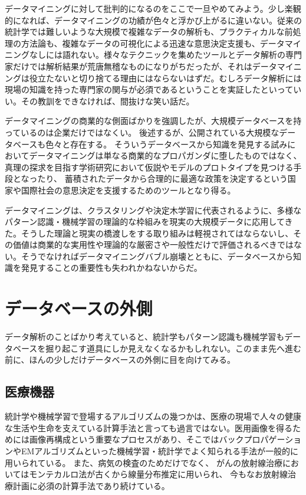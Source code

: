 データマイニングに対して批判的になるのをここで一旦やめてみよう。少し楽観的になれば、データマイニングの功績が色々と浮かび上がるに違いない。従来の統計学では難しいような大規模で複雑なデータの解析も、プラクティカルな前処理の方法論も、複雑なデータの可視化による迅速な意思決定支援も、データマイニングなしには語れない。様々なテクニックを集めたツールとデータ解析の専門家だけでは解析結果が荒唐無稽なものになりがちだったが、それはデータマイニングは役立たないと切り捨てる理由にはならないはずだ。むしろデータ解析には現場の知識を持った専門家の関与が必須であるということを実証したといっていい。その教訓をできなければ、間抜けな笑い話だ。

データマイニングの商業的な側面ばかりを強調したが、大規模データベースを持っているのは企業だけではなくい。
後述するが、公開されている大規模なデータベースも色々と存在する。
そういうデータベースから知識を発見する試みにおいてデータマイニングは単なる商業的なプロパガンダに堕したものではなく、真理の探求を目指す学術研究において仮説やモデルのプロトタイプを見つける手段となったり、
蓄積されたデータから合理的に最適な政策を決定するという国家や国際社会の意思決定を支援するためのツールとなり得る。

データマイニングは、クラスタリングや決定木学習に代表されるように、多様なパターン認識・機械学習の理論的な枠組みを現実の大規模データに応用してきた。そうした理論と現実の橋渡しをする取り組みは軽視されてはならないし、その価値は商業的な実用性や理論的な厳密さや一般性だけで評価されるべきではない。そうでなければデータマイニングバブル崩壊とともに、データベースから知識を発見することの重要性も失われかねないからだ。

\section{データベースの外側}
データ解析のことばかり考えていると、統計学もパターン認識も機械学習もデータベースを掘り起こす道具にしか見えなくなるかもしれない。このまま先へ進む前に、ほんの少しだけデータベースの外側に目を向けてみる。
\subsection{医療機器}
統計学や機械学習で登場するアルゴリズムの幾つかは、医療の現場で人々の健康な生活や生命を支えている計算手法と言っても過言ではない。医用画像を得るためには画像再構成という重要なプロセスがあり、そこではバックプロパゲーションやEMアルゴリズムといった機械学習・統計学でよく知られる手法が一般的に用いられている。
また、病気の検査のためだけでなく、
がんの放射線治療においてはモンテカルロ法が古くから線量分布推定に用いられ、
今もなお放射線治療計画に必須の計算手法であり続けている。

